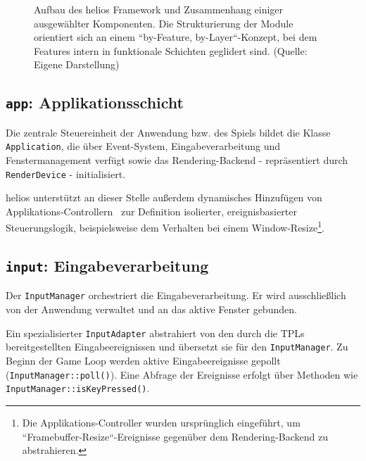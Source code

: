 \begin{figure}[t]
    \centering
    \caption{Aufbau des helios Framework und Zusammenhang einiger ausgewählter Komponenten. Die Strukturierung der Module orientiert sich an einem ``by-Feature, by-Layer``-Konzept, bei dem Features intern in funktionale Schichten geglidert sind. (Quelle: Eigene Darstellung)}

    \label{fig:package_diagram}

\end{figure}


\subsection*{\texttt{app}: Applikationsschicht}
Die zentrale Steuereinheit der Anwendung bzw. des Spiels bildet die Klasse \texttt{Application}, die über Event-System, Eingabeverarbeitung und Fenstermanagement verfügt sowie das Rendering-Backend - repräsentiert durch \texttt{RenderDevice} - initialisiert.\par
helios unterstützt an dieser Stelle außerdem dynamisches Hinzufügen von Applikations-Controllern~\cite[379]{Fow03} zur Definition isolierter, ereignisbasierter Steuerungslogik, beispielsweise dem Verhalten bei einem Window-Resize\footnote{
Die Applikations-Controller wurden ursprünglich eingeführt, um ``Framebuffer-Resize``-Ereignisse gegenüber dem Rendering-Backend zu abstrahieren.
}.

\subsection*{\texttt{input}: Eingabeverarbeitung}
Der \texttt{InputManager} orchestriert die Eingabeverarbeitung.
Er wird ausschließlich von der Anwendung verwaltet und an das aktive Fenster gebunden.\par
Ein spezialisierter \texttt{InputAdapter} abstrahiert von den durch die TPLs bereitgestellten Eingabeereignissen und übersetzt sie für den \texttt{InputManager}.
Zu Beginn der Game Loop werden aktive Eingabeereignisse gepollt (\texttt{InputManager::poll()}). Eine Abfrage der Ereignisse erfolgt über Methoden wie \texttt{InputManager::isKeyPressed()}.

